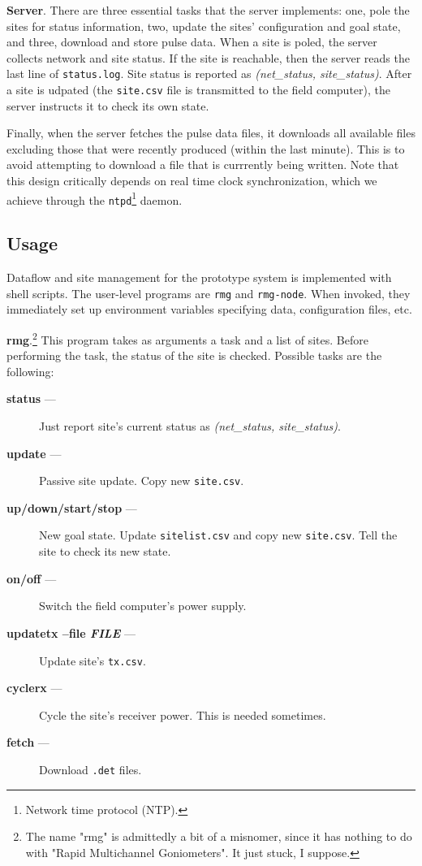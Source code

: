 \documentclass[letter]{article}
\newcounter{foot}
\begin{document}
\textbf{Server}. There are three essential tasks that the server implements: one, pole the 
sites for status information, two, update the sites' configuration and goal state, and three,
download and store pulse data. When a site is poled, the server collects network and site status. 
If the site is reachable, then the server reads the last line of \texttt{status.log}. Site status
is reported as \textit{(net\_status, site\_status)}. After a site is udpated (the \texttt{site.csv} 
file is transmitted to the field computer), the server instructs it to check its own state. 
   
Finally, when the server fetches the pulse data files, it downloads all available files excluding 
those that were recently produced (within the last minute). This is to avoid attempting to download 
a file that is currrently being written. Note that this design critically depends on real time clock
synchronization, which we achieve through the \texttt{ntpd}\footnote{Network time protocol (NTP).}
daemon. 

\subsection{Usage}
Dataflow and site management for the prototype system is implemented with shell scripts. The
user-level programs are \texttt{rmg} and \texttt{rmg-node}. When invoked, they immediately 
set up environment variables specifying data, configuration files, etc. 

\textbf{rmg}.\footnote{The name "rmg" is admittedly a bit of a misnomer, since it 
has nothing to do with "Rapid Multichannel Goniometers". It just stuck, I suppose.} This program
takes as arguments a task and a list of sites. Before performing the task, the status of the site
is checked. Possible tasks are the following: 
\begin{description}
  \item[\quad \textbf{status} ---] Just report site's current status as \textit{(net\_status, site\_status)}.
  \item[\quad \textbf{update} ---] Passive site update. Copy new \texttt{site.csv}. 
  \item[\quad \textbf{up/down/start/stop} ---] New goal state. Update \texttt{sitelist.csv} and copy new 
    \texttt{site.csv}. Tell the site to check its new state. 
  \item[\quad \textbf{on/off} ---] Switch the field computer's power supply. 
  \item[\quad \textbf{updatetx --file \textit{FILE}} ---] Update site's \texttt{tx.csv}.
  \item[\quad \textbf{cyclerx} ---] Cycle the site's receiver power. This is needed sometimes. 
  \item[\quad \textbf{fetch} ---] Download \texttt{.det} files.  
\end{description}
\end{document}

